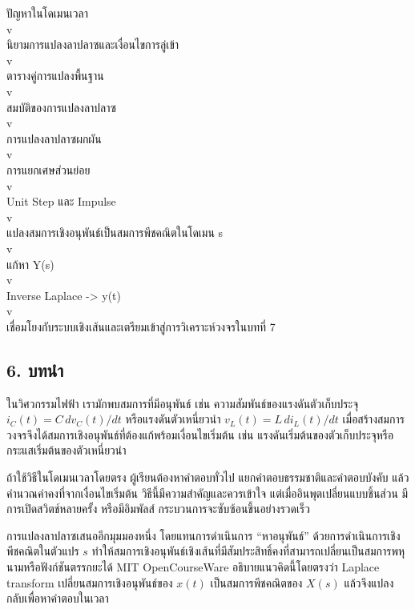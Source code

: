 \begin{center}
 ปัญหาในโดเมนเวลา\\
    v\\
นิยามการแปลงลาปลาซและเงื่อนไขการลู่เข้า\\
    v\\
ตารางคู่การแปลงพื้นฐาน\\
    v\\
สมบัติของการแปลงลาปลาซ\\
    v\\
การแปลงลาปลาซผกผัน\\
    v\\
การแยกเศษส่วนย่อย\\
    v\\
Unit Step และ Impulse\\
    v\\
แปลงสมการเชิงอนุพันธ์เป็นสมการพีชคณิตในโดเมน s\\
    v\\
แก้หา Y(s)\\
    v\\
Inverse Laplace -> y(t)\\
    v\\
เชื่อมโยงกับระบบเชิงเส้นและเตรียมเข้าสู่การวิเคราะห์วงจรในบทที่ 7\\
\end{center}

\subsection{6. บทนำ}

ในวิศวกรรมไฟฟ้า เรามักพบสมการที่มีอนุพันธ์ เช่น ความสัมพันธ์ของแรงดันตัวเก็บประจุ $i_C(t)=C\,dv_C(t)/dt$ หรือแรงดันตัวเหนี่ยวนำ $v_L(t)=L\,di_L(t)/dt$ เมื่อสร้างสมการวงจรจึงได้สมการเชิงอนุพันธ์ที่ต้องแก้พร้อมเงื่อนไขเริ่มต้น เช่น แรงดันเริ่มต้นของตัวเก็บประจุหรือกระแสเริ่มต้นของตัวเหนี่ยวนำ

ถ้าใช้วิธีในโดเมนเวลาโดยตรง ผู้เรียนต้องหาคำตอบทั่วไป แยกคำตอบธรรมชาติและคำตอบบังคับ แล้วคำนวณค่าคงที่จากเงื่อนไขเริ่มต้น วิธีนี้มีความสำคัญและควรเข้าใจ แต่เมื่ออินพุตเปลี่ยนแบบชิ้นส่วน มีการเปิดสวิตช์หลายครั้ง หรือมีอิมพัลส์ กระบวนการจะซับซ้อนขึ้นอย่างรวดเร็ว

การแปลงลาปลาซเสนออีกมุมมองหนึ่ง โดยแทนการดำเนินการ “หาอนุพันธ์” ด้วยการดำเนินการเชิงพีชคณิตในตัวแปร $s$ ทำให้สมการเชิงอนุพันธ์เชิงเส้นที่มีสัมประสิทธิ์คงที่สามารถเปลี่ยนเป็นสมการพหุนามหรือฟังก์ชันตรรกยะได้ MIT OpenCourseWare อธิบายแนวคิดนี้โดยตรงว่า Laplace transform เปลี่ยนสมการเชิงอนุพันธ์ของ $x(t)$ เป็นสมการพีชคณิตของ $X(s)$ แล้วจึงแปลงกลับเพื่อหาคำตอบในเวลา

